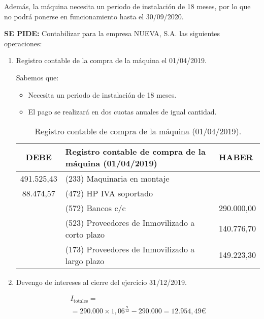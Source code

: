Además, la máquina necesita un periodo de instalación de 18 meses, por lo que no podrá ponerse en funcionamiento hasta el 30/09/2020.

\textbf{SE PIDE:} Contabilizar para la empresa NUEVA, S.A. las siguientes operaciones:
\begin{enumerate}[label=\alph*)]
    \item Registro contable de la compra de la máquina el 01/04/2019.
    
    Sabemos que:
    \begin{itemize}
        \item Necesita un periodo de instalación de 18 meses.
        \item El pago se realizará en dos cuotas anuales de igual cantidad.
    \end{itemize}

    \begin{table}[H]
        \centering
        \begin{tabular}{|c|p{8cm}|p{2cm}|}
            \hline
            \rowcolor{blue!30}
            \textbf{DEBE} & \textbf{Registro contable de compra de la máquina (01/04/2019)} & \textbf{HABER} \\
            \hline
            491.525,43 & (233) Maquinaria en montaje & \\
            \hline
            88.474,57 & (472) HP IVA soportado & \\
            \hline
            & (572) Bancos c/c & 290.000,00 \\
            \hline
            & (523) Proveedores de Inmovilizado a corto plazo & 140.776,70 \\
            \hline
            & (173) Proveedores de Inmovilizado a largo plazo & 149.223,30 \\
            \hline
        \end{tabular}
        \caption{Registro contable de compra de la máquina (01/04/2019).}
        \label{tabla:compra_maquina}
    \end{table}



    \item Devengo de intereses al cierre del ejercicio 31/12/2019.
    
    \begin{align*}
        I_{\text{totales}} = \\
        = 290.000 \times 1,06^{\frac{9}{12}} - 290.000 = 12.954,49 €
    \end{align*}


\end{enumerate}
